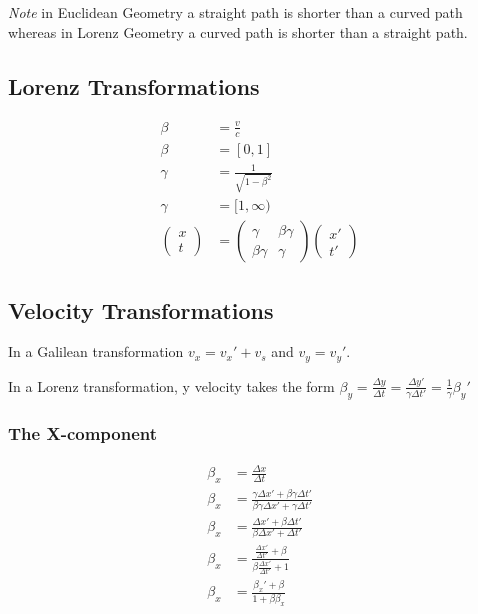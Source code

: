 \documentclass[12pt,letterpaper, twocolumn]{article}
\begin{document}
\textit{Note} in Euclidean Geometry a straight path is shorter than a curved path whereas in Lorenz Geometry a curved path is shorter than a straight path.

\subsection{Lorenz Transformations}
\begin{align*}
    \beta &= \frac{v}{c}\\
    \beta &= [0,1]\\
    \gamma &= \frac{1}{\sqrt{1-\beta^2}}\\
    \gamma &= [1,\infty)\\
    \begin{pmatrix}
    x\\t
    \end{pmatrix} &= \begin{pmatrix}\gamma & \beta \gamma \\ \beta \gamma & \gamma\end{pmatrix}\begin{pmatrix}x'\\t'\end{pmatrix}
\end{align*}

\subsection{Velocity Transformations}
In a Galilean transformation $v_x=v_x'+v_s$ and $v_y=v_y'$. 

In a Lorenz transformation, y velocity takes the form $\beta_y=\frac{\Delta y}{\Delta t} = \frac{\Delta y'}{\gamma \Delta t'} = \frac{1}{\gamma}\beta_y'$

\subsubsection*{The X-component}
\begin{align*}
    \beta_x &= \frac{\Delta x}{\Delta t}\\
    \beta_x &= \frac{\gamma \Delta x' + \beta \gamma \Delta t'}{ \beta \gamma \Delta x' + \gamma \Delta t'}\\
    \beta_x &= \frac{ \Delta x' + \beta  \Delta t'}{ \beta  \Delta x' +  \Delta t'}\\
    \beta_x &= \frac{\frac{\Delta x'}{\Delta t'} + \beta}{ \beta  \frac{\Delta x'}{\Delta t'} +  1}\\
    \beta_x &= \frac{\beta_x' + \beta}{1+\beta\beta_x}
\end{align*}
\end{document}
